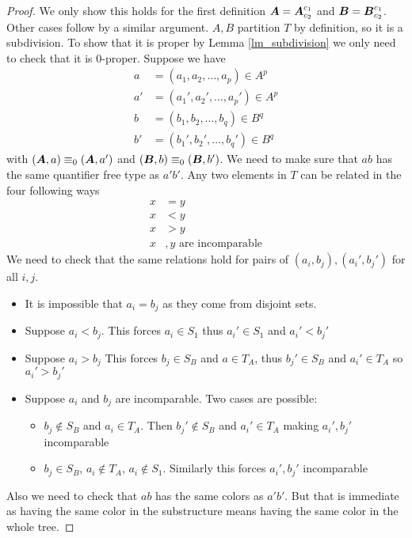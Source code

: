 \documentclass{amsart}
\DeclareMathOperator{\A}{\boldface A}
\DeclareMathOperator{\B}{\boldface B}
\begin{document}
\begin{proof}
	We only show this holds for the first definition $\A = \A^{c_1}_{c_2}$ and $\B = \B^{c_1}_{c_2}$. Other cases follow by a similar argument. $A,B$ partition $T$ by definition, so it is a subdivision. To show that it is proper by Lemma \ref{lm_subdivision} we only need to check that it is $0$-proper. Suppose we have 
	\begin{align*}
		a &= (a_1, a_2, \ldots, a_p) \in A^p \\
		a' &= (a_1', a_2', \ldots, a_p') \in A^p  \\
		b &= (b_1, b_2, \ldots, b_q) \in B^q  \\
		b' &= (b_1', b_2', \ldots, b_q') \in B^q 
	\end{align*}
	with $(\A, a) \equiv_0 (\A, a')$ and $(\B, b) \equiv_0 (\B, b')$. We need to make sure that $ab$ has the same quantifier free type as $a'b'$. Any two elements in $T$ can be related in the four following ways
	\begin{align*}
		x &= y \\
		x &< y \\
		x &> y \\
		x&,y \text{ are incomparable}
	\end{align*}
	We need to check that the same relations hold for pairs of $(a_i, b_j), (a_i', b_j')$ for all $i,j$.
	
	\begin{itemize}
		\item It is impossible that $a_i = b_j$ as they come from disjoint sets.
		\item Suppose $a_i < b_j$. This forces $a_i \in S_1$ thus $a_i' \in S_1$ and $a_i' < b_j'$ 
		\item Suppose $a_i > b_j$ This forces $b_j \in S_B$ and $a \in T_A$, thus $b_j' \in S_B$ and $a_i' \in T_A$ so $a_i' > b_j'$ 
		\item Suppose $a_i$ and $b_j$ are incomparable. Two cases are possible:
		\begin{itemize}
			\item $b_j \notin S_B$ and $a_i \in T_A$. Then $b_j' \notin S_B$ and $a_i' \in T_A$ making $a_i', b_j'$ incomparable
			\item $b_j \in S_B$, $a_i \notin T_A$, $a_i \notin S_1$. Similarly this forces $a_i', b_j'$ incomparable
		\end{itemize}
	\end{itemize}
	Also we need to check that $ab$ has the same colors as $a'b'$. But that is immediate as having the same color in the substructure means having the same color in the whole tree.
\end{proof}
\end{document}
